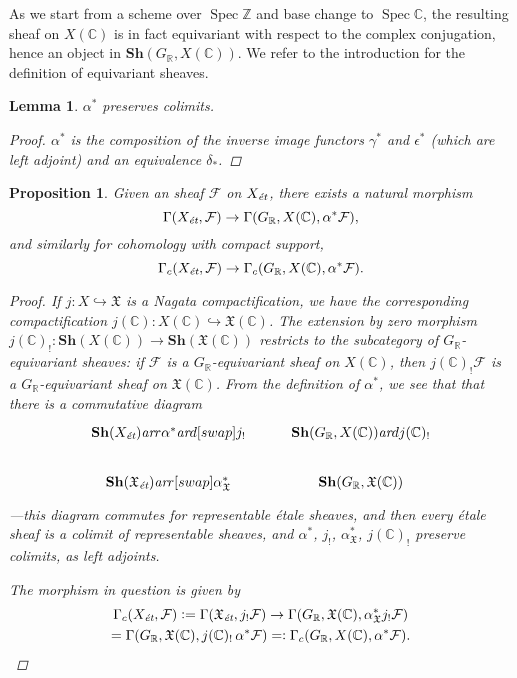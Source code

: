 \documentclass[leqno,12pt]{article}
\theoremstyle{plain}
\newtheorem{lemma}[theorem]{\indent\sc Lemma}
\newtheorem{proposition}[theorem]{\indent\sc Proposition}
\theoremstyle{definition}
\DeclareMathOperator{\Spec}{Spec}
\newcommand{\CC}{\mathbb{C}}
\newcommand{\RR}{\mathbb{R}}
\newcommand{\ZZ}{\mathbb{Z}}
\newcommand{\dfn}{\mathrel{\mathop:}=}
\newcommand{\rdfn}{=\mathrel{\mathop:}}
\newcommand{\ar}{\text{\it ar}}
\newcommand{\et}{\text{\it \'{e}t}}
\begin{document}
As we start from a scheme over $\Spec \ZZ$ and base change to $\Spec \CC$, the
resulting sheaf on $X (\CC)$ is in fact equivariant with respect to the complex
conjugation, hence an object in $\mathbf{Sh} (G_\RR, X (\CC))$. We refer to the
introduction for the definition of equivariant sheaves.

\begin{lemma}
  \label{lemma:alpha-preserves-colimits}
  $\alpha^*$ preserves colimits.

  \begin{proof}
    $\alpha^*$ is the composition of the inverse image functors $\gamma^*$ and
    $\epsilon^*$ (which are left adjoint) and an equivalence $\delta_*$.
  \end{proof}
\end{lemma}

\begin{proposition}
  \label{prop:inverse-image-gamma}
  Given an sheaf $\mathcal{F}$ on $X_\et$, there exists a natural morphism
  $$\Gamma (X_\et, \mathcal{F}) \to \Gamma (G_\RR, X (\CC), \alpha^* \mathcal{F}),$$
  and similarly for cohomology with compact support,
  $$\Gamma_c (X_\et, \mathcal{F}) \to \Gamma_c (G_\RR, X (\CC), \alpha^* \mathcal{F}).$$

  \begin{proof}
    If $j\colon X \hookrightarrow \mathfrak{X}$ is a Nagata compactification, we
    have the corresponding compactification
    $j (\CC)\colon X (\CC) \hookrightarrow \mathfrak{X} (\CC)$. The extension by
    zero morphism
    $j (\CC)_!\colon \mathbf{Sh} (X (\CC)) \to \mathbf{Sh} (\mathfrak{X} (\CC))$
    restricts to the subcategory of $G_\RR$-equivariant sheaves: if
    $\mathcal{F}$ is a $G_\RR$-equivariant sheaf on $X (\CC)$, then
    $j (\CC)_!  \mathcal{F}$ is a $G_\RR$-equivariant sheaf on
    $\mathfrak{X} (\CC)$. From the definition of $\alpha^*$, we see that that
    there is a commutative diagram
    \[ \begin{tikzcd}
        \mathbf{Sh} (X_\et) \ar{r}{\alpha^*}\ar{d}[swap]{j_!} & \mathbf{Sh} (G_\RR, X (\CC)) \ar{d}{j (\CC)_!} \\
        \mathbf{Sh} (\mathfrak{X}_\et) \ar{r}[swap]{\alpha^*_\mathfrak{X}} & \mathbf{Sh} (G_\RR, \mathfrak{X} (\CC))
      \end{tikzcd} \]
    ---this diagram commutes for representable \'{e}tale sheaves, and then every
    \'{e}tale sheaf is a colimit of representable sheaves, and $\alpha^*$,
    $j_!$, $\alpha^*_\mathfrak{X}$, $j (\CC)_!$ preserve colimits, as left
    adjoints.

    The morphism in question is given by
    \begin{multline*}
      \Gamma_c (X_\et, \mathcal{F}) \dfn \Gamma (\mathfrak{X}_\et, j_! \mathcal{F}) \to
      \Gamma (G_\RR, \mathfrak{X} (\CC), \alpha^*_\mathfrak{X} j_! \mathcal{F}) \\
      =
      \Gamma (G_\RR, \mathfrak{X} (\CC), j (\CC)_! \, \alpha^* \mathcal{F})
      \rdfn \Gamma_c (G_\RR, X (\CC), \alpha^* \mathcal{F}). \qedhere
    \end{multline*}
  \end{proof}
\end{proposition}
\end{document}
